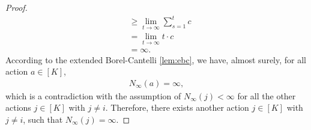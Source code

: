 \begin{proof}
\begin{align}
    &\ge \lim_{t \to \infty}{ \sum_{s=1}^{t}{ c } } \\
    &= \lim_{t \to \infty}{ t \cdot c } \\
    &= \infty.
\end{align}
According to the extended Borel-Cantelli \cref{lem:ebc}, we have, almost surely, for all action $a \in [K]$,
\begin{align}
\label{eq:at_least_two_actions_infinite_sample_time_proof_11}
    N_\infty(a) = \infty,
\end{align}
which is a contradiction with the assumption of $N_\infty(j) < \infty$ for all the other actions $j \in [K]$ with $j \ne i$. Therefore, there exists another action $j \in [K]$ with $j \ne i$, such that $N_\infty(j) = \infty$.
\end{proof}

